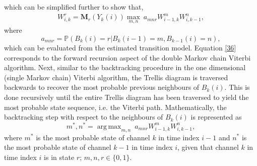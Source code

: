 \documentclass[10pt,twocolumn]{IEEEtran}
\DeclareMathOperator*{\argmax}{arg\,max}
\begin{document}
which can be simplified further to show that,
\begin{equation}\label{36}
    \begin{aligned}
        W_{i,k}^{r} = \mathbf{M}_r(Y_k(i))\max_{m,n}\ a_{mnr}W_{i-1,k}^{m}W_{i,k-1}^{n},
    \end{aligned}
\end{equation}
where
\begin{equation}\label{37}
    a_{mnr} = \mathbb{P}(B_k(i)=r|B_{k}(i-1)=m,B_{k-1}(i)=n),
\end{equation}
which can be evaluated from the estimated transition model. Equation \eqref{36} corresponds to the forward recursion aspect of the double Markov chain Viterbi algorithm. Next, similar to the backtracking procedure in the one dimensional (single Markov chain) Viterbi algorithm, the Trellis diagram is traversed backwards to recover the most probable previous neighbours of $B_k(i)$. This is done recursively until the entire Trellis diagram has been traversed to yield the most probable state sequence, i.e. the Viterbi path. Mathematically, the backtracking step with respect to the neighbours of $B_k(i)$ is represented as
\begin{equation}\label{38}
    m^*, n^* = \argmax_{m,n}\ a_{mnr}W_{i-1,k}^{m}W_{i,k-1}^{n},
\end{equation}
where $m^*$ is the most probable state of channel $k$ in time index $i-1$ and $n^*$ is the most probable state of channel $k-1$ in time index $i$, given that channel $k$ in time index $i$ is in state $r$; $m, n, r \in \{0,1\}$.
\end{document}
